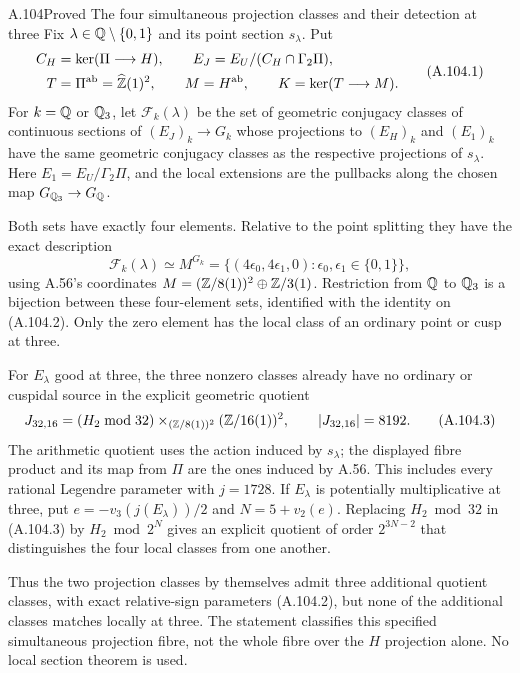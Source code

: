 \begin{statement}{A.104}{Proved}
{The four simultaneous projection classes and their detection at three}
Fix $\lambda\in\mathbb Q\setminus\{0,1\}$ and its point
section $s_\lambda$.  Put
\[
 \begin{split}
  C_H&=\ker(\Pi\longrightarrow H),\qquad
  E_J=E_U/(C_H\cap\Gamma_2\Pi),\\
  T&=\Pi^{\rm ab}=\widehat{\mathbb Z}(1)^2,\qquad
  M=H^{\rm ab},\qquad K=\ker(T\longrightarrow M).
 \end{split}
\tag{A.104.1}
\]
For $k=\mathbb Q$ or $\mathbb Q_3$, let $\mathcal F_k(\lambda)$
be the set of geometric conjugacy classes of continuous
sections of $(E_J)_k\to G_k$ whose projections to
$(E_H)_k$ and $(E_1)_k$ have the same geometric
conjugacy classes as the respective projections of
$s_\lambda$.  Here $E_1=E_U/\Gamma_2\Pi$, and the
local extensions are the pullbacks along the chosen
map $G_{\mathbb Q_3}\to G_\mathbb Q$.

Both sets have exactly four elements.  Relative to
the point splitting they have the exact description
\[
 \mathcal F_k(\lambda)
      \simeq M^{G_k}
      =\{(4\epsilon_0,4\epsilon_1,0):
                       \epsilon_0,\epsilon_1\in\{0,1\}\},
\tag{A.104.2}
\]
using A.56's coordinates
$M=(\mathbb Z/8(1))^2\oplus\mathbb Z/3(1)$.
Restriction from $\mathbb Q$ to $\mathbb Q_3$ is a bijection
between these four-element sets, identified with
the identity on (A.104.2).
Only the zero element has the local class of an
ordinary point or cusp at three.

For $E_\lambda$ good at three, the three nonzero
classes already have no ordinary or cuspidal source
in the explicit
geometric quotient
\[
       J_{32,16}=
       (H_2\bmod32)
          \mathbin{\times}_{(\mathbb Z/8(1))^2}
                            (\mathbb Z/16(1))^2,
                 \qquad |J_{32,16}|=8192.
\tag{A.104.3}
\]
The arithmetic quotient uses the action induced
by $s_\lambda$; the displayed fibre product and its
map from $\Pi$ are the ones induced by A.56.
This includes every rational Legendre parameter
with $j=1728$.
If $E_\lambda$ is potentially multiplicative at
three, put $e=-v_3(j(E_\lambda))/2$ and
$N=5+v_2(e)$.  Replacing $H_2\bmod32$ in
(A.104.3) by $H_2\bmod2^N$ gives an explicit
quotient of order $2^{3N-2}$ that distinguishes
the four local classes from one another.

Thus the two projection classes by themselves
admit three additional quotient classes, with
exact relative-sign parameters (A.104.2), but
none of the additional classes matches locally
at three.  The statement classifies this specified
simultaneous projection fibre, not the whole
fibre over the $H$ projection alone.
No local section theorem is used.
\end{statement}
